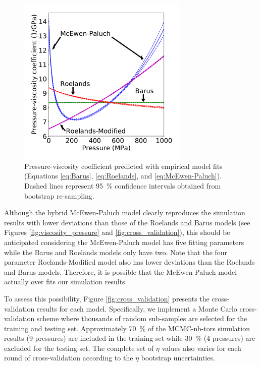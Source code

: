 \documentclass[preprint,review,12pt]{elsarticle}
\begin{document}
	\begin{figure}[htb!]
		\centering
		\includegraphics[width=3.2in]{Pressure_viscosity_coefficient.pdf}
		\caption{Pressure-viscosity coefficient predicted with empirical model fits (Equations \ref{eq:Barus}, \ref{eq:Roelands}, and \ref{eq:McEwen-Paluch}). Dashed lines represent 95~\% confidence intervals obtained from bootstrap re-sampling.}
		\label{fig:viscosity_pressure_coefficent}
	\end{figure}

	
	
	Although the hybrid McEwen-Paluch model clearly reproduces the simulation results with lower deviations than those of the Roelands and Barus models (see Figures \ref{fig:viscosity_pressure} and \ref{fig:cross_validation}), this should be anticipated considering the McEwen-Paluch model has five fitting parameters while the Barus and Roelands models only have two. Note that the four parameter Roelands-Modified model also has lower deviations than the Roelands and Barus models. Therefore, it is possible that the McEwen-Paluch model actually over fits our simulation results. 
	
	To assess this possibility, Figure \ref{fig:cross_validation} presents the cross-validation results for each model. Specifically, we implement a Monte Carlo cross-validation scheme where thousands of random sub-samples are selected for the training and testing set. Approximately 70~\% of the MCMC-nb-tors simulation results (9 pressures) are included in the training set while 30~\% (4 pressures) are excluded for the testing set. The complete set of $\eta$ values also varies for each round of cross-validation according to the $\eta$ bootstrap uncertainties. 
	
\end{document}

